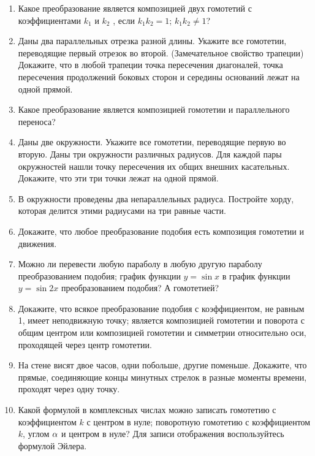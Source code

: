 \begin{enumerate}
\item Какое преобразование является композицией двух гомотетий
с коэффициентами $k_1$ и $k_2$ , если \ipunkt $k_1k_2 = 1$; \ipunkt $k_1k_2\ne 1$?

\item \ipunkt Даны два параллельных отрезка разной длины. Укажите
все гомотетии, переводящие первый отрезок во второй.
\ipunkt (Замечательное свойство трапеции) Докажите, что в любой трапеции точка пересечения диагоналей, точка пересечения продолжений боковых сторон и середины оснований лежат на одной
прямой.

\item  Какое преобразование является композицией гомотетии и параллельного переноса?

\item \ipunkt Даны две окружности. Укажите все гомотетии, переводящие первую во вторую.
\ipunkt Даны три окружности различных радиусов. Для каждой пары
окружностей нашли точку пересечения их общих внешних касательных.
 Докажите, что эти три точки лежат на одной прямой.

\item В окружности проведены два непараллельных радиуса. Постройте
 хорду, которая делится этими радиусами на три равные части.

\item Докажите, что любое преобразование подобия есть композиция гомотетии и движения.

\item Можно ли перевести
\ipunkt любую параболу в любую другую параболу преобразованием подобия;
\ipunkt график функции $y = \sin x$ в график функции $y = \sin 2x$ преобразованием подобия? А гомотетией?

\item Докажите, что всякое преобразование подобия с коэффициентом, не равным 1,
\ipunkt имеет неподвижную точку;
\ipunkt является композицией гомотетии и поворота с общим центром
или композицией гомотетии и симметрии относительно оси, проходящей через центр гомотетии.

\item На стене висят двое часов, одни побольше, другие поменьше.
Докажите, что прямые, соединяющие концы минутных стрелок в
разные моменты времени, проходят через одну точку.

\item Какой формулой в комплексных числах можно записать \ipunkt гомотетию с коэффициентом $k$ с центром в нуле;
\ipunkt поворотную гомотетию с коэффициентом $k$, углом $\alpha$ и центром в нуле?
Для записи отображения воспользуйтесь формулой Эйлера.


\end{enumerate}



